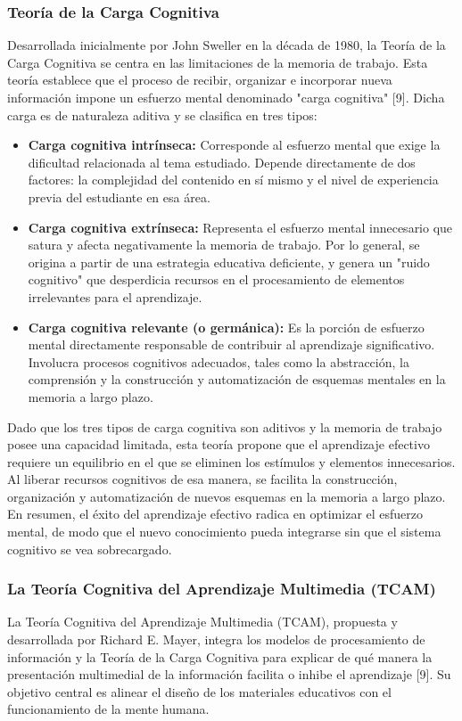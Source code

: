 \documentclass[11pt]{article}
\begin{document}
\subsubsection*{Teoría de la Carga Cognitiva}
Desarrollada inicialmente por John Sweller en la década de 1980, la Teoría de la Carga Cognitiva se centra en las limitaciones de la memoria de trabajo. Esta teoría establece que el proceso de recibir, organizar e incorporar nueva información impone un esfuerzo mental denominado "carga cognitiva" [9]. Dicha carga es de naturaleza aditiva y se clasifica en tres tipos:

\begin{itemize}
    \item \textbf{Carga cognitiva intrínseca:} Corresponde al esfuerzo mental que exige la dificultad relacionada al tema estudiado. Depende directamente de dos factores: la complejidad del contenido en sí mismo y el nivel de experiencia previa del estudiante en esa área.
    \item \textbf{Carga cognitiva extrínseca:} Representa el esfuerzo mental innecesario que satura y afecta negativamente la memoria de trabajo. Por lo general, se origina a partir de una estrategia educativa deficiente, y genera un "ruido cognitivo" que desperdicia recursos en el procesamiento de elementos irrelevantes para el aprendizaje.
    \item \textbf{Carga cognitiva relevante (o germánica):} Es la porción de esfuerzo mental directamente responsable de contribuir al aprendizaje significativo. Involucra procesos cognitivos adecuados, tales como la abstracción, la comprensión y la construcción y automatización de esquemas mentales en la memoria a largo plazo.
\end{itemize}

Dado que los tres tipos de carga cognitiva son aditivos y la memoria de trabajo posee una capacidad limitada, esta teoría propone que el aprendizaje efectivo requiere un equilibrio en el que se eliminen los estímulos y elementos innecesarios. Al liberar recursos cognitivos de esa manera, se facilita la construcción, organización y automatización de nuevos esquemas en la memoria a largo plazo. En resumen, el éxito del aprendizaje efectivo radica en optimizar el esfuerzo mental, de modo que el nuevo conocimiento pueda integrarse sin que el sistema cognitivo se vea sobrecargado.

\subsubsection*{La Teoría Cognitiva del Aprendizaje Multimedia (TCAM)}
La Teoría Cognitiva del Aprendizaje Multimedia (TCAM), propuesta y desarrollada por Richard E. Mayer, integra los modelos de procesamiento de información y la Teoría de la Carga Cognitiva para explicar de qué manera la presentación multimedial de la información facilita o inhibe el aprendizaje [9]. Su objetivo central es alinear el diseño de los materiales educativos con el funcionamiento de la mente humana.
\end{document}

